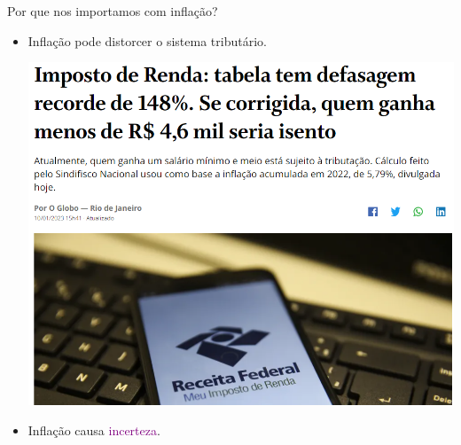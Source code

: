 \documentclass[10pt]{beamer}
\begin{document}
\begin{frame}{Por que nos importamos com inflação?}
    \begin{itemize}
        \item Inflação pode distorcer o sistema tributário.
        \begin{center}
            \begin{minipage}[b]{.5\textwidth}
                \href{https://oglobo.globo.com/economia/imposto-de-renda/noticia/2023/01/imposto-de-renda-defasagem-na-tabela-atinge-148percent-e-chega-a-recorde-historico.ghtml}{\includegraphics[width=\textwidth]{./figures/irf.PNG}}
            \end{minipage}
        \end{center}
        \item Inflação causa \textcolor{purple}{incerteza}.
    \end{itemize}
\end{frame}
\end{document}
